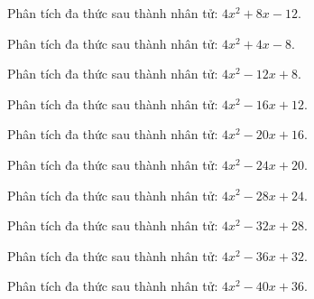 \begin{bt}
	Phân tích đa thức sau thành nhân tử: $4 x^2 + 8 x - 12$.
\end{bt}
\begin{bt}
	Phân tích đa thức sau thành nhân tử: $4 x^2 + 4 x - 8$.
\end{bt}
\begin{bt}
	Phân tích đa thức sau thành nhân tử: $4 x^2 - 12 x + 8$.
\end{bt}
\begin{bt}
	Phân tích đa thức sau thành nhân tử: $4 x^2 - 16 x + 12$.
\end{bt}
\begin{bt}
	Phân tích đa thức sau thành nhân tử: $4 x^2 - 20 x + 16$.
\end{bt}
\begin{bt}
	Phân tích đa thức sau thành nhân tử: $4 x^2 - 24 x + 20$.
\end{bt}
\begin{bt}
	Phân tích đa thức sau thành nhân tử: $4 x^2 - 28 x + 24$.
\end{bt}
\begin{bt}
	Phân tích đa thức sau thành nhân tử: $4 x^2 - 32 x + 28$.
\end{bt}
\begin{bt}
	Phân tích đa thức sau thành nhân tử: $4 x^2 - 36 x + 32$.
\end{bt}
\begin{bt}
	Phân tích đa thức sau thành nhân tử: $4 x^2 - 40 x + 36$.
\end{bt}

